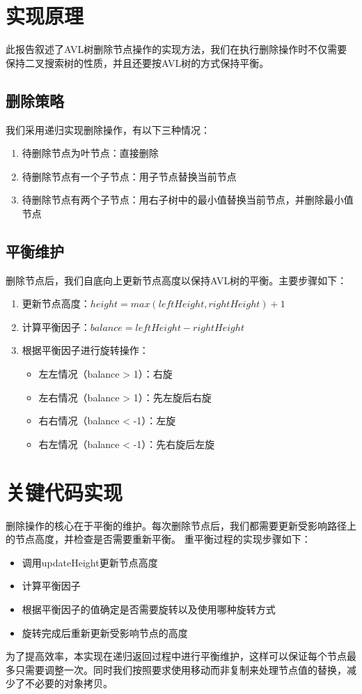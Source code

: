 \documentclass[UTF8]{ctexart}
\begin{document}
\pagestyle{fancy}
\fancyhead{}



\section{实现原理}

此报告叙述了AVL树删除节点操作的实现方法，我们在执行删除操作时不仅需要保持二叉搜索树的性质，并且还要按AVL树的方式保持平衡。

\subsection{删除策略}

我们采用递归实现删除操作，有以下三种情况：

\begin{enumerate}
    \item 待删除节点为叶节点：直接删除
    \item 待删除节点有一个子节点：用子节点替换当前节点
    \item 待删除节点有两个子节点：用右子树中的最小值替换当前节点，并删除最小值节点
\end{enumerate}

\subsection{平衡维护}

删除节点后，我们自底向上更新节点高度以保持AVL树的平衡。主要步骤如下：

\begin{enumerate}
    \item 更新节点高度：$height = max(leftHeight, rightHeight) + 1$
    \item 计算平衡因子：$balance = leftHeight - rightHeight$
    \item 根据平衡因子进行旋转操作：
    \begin{itemize}
        \item 左左情况（balance > 1）：右旋
        \item 左右情况（balance > 1）：先左旋后右旋
        \item 右右情况（balance < -1）：左旋
        \item 右左情况（balance < -1）：先右旋后左旋
    \end{itemize}
\end{enumerate}

\section{关键代码实现}

删除操作的核心在于平衡的维护。每次删除节点后，我们都需要更新受影响路径上的节点高度，并检查是否需要重新平衡。
重平衡过程的实现步骤如下：

\begin{itemize}
    \item 调用updateHeight更新节点高度
    \item 计算平衡因子
    \item 根据平衡因子的值确定是否需要旋转以及使用哪种旋转方式
    \item 旋转完成后重新更新受影响节点的高度
\end{itemize}

为了提高效率，本实现在递归返回过程中进行平衡维护，这样可以保证每个节点最多只需要调整一次。同时我们按照要求使用移动而非复制来处理节点值的替换，减少了不必要的对象拷贝。
\end{document}
